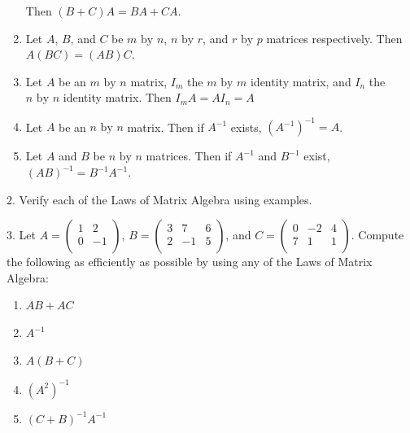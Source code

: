 \documentclass[10pt,]{book}
\theoremstyle{plain}
\theoremstyle{definition}
\theoremstyle{definition}
\theoremstyle{definition}
\theoremstyle{definition}
\begin{document}
\begin{exercisegroup}
\begin{enumerate}[label=\alph*]
 Then \((B+C)A=BA+CA\).%
\item\hypertarget{li-84}{} Let \(A\), \(B\), and \(C\) be \(m \textrm{ by } n\), \(n \textrm{ by } r\), and \(r \textrm{ by } p\) matrices respectively.
 Then \(A(BC)=(AB)C\).%
\item\hypertarget{li-85}{}Let \(A\) be an \(m \textrm{ by } n\) matrix, \(I_m\) the \(m \textrm{ by } m\) identity matrix,
 and \(I_n\) the \(n \textrm{ by } n\) identity matrix. Then \(I_mA=AI_n=A\)%
\item\hypertarget{li-86}{} Let \(A\) be an \(n \textrm{ by } n\) matrix. Then if \(A^{-1}\) exists,
 \(\left(A^{-1}\right)^{-1}=A\).%
\item\hypertarget{li-87}{} Let \(A\) and \(B\) be \(n \textrm{ by } n\) matrices.
 Then if \(A^{-1}\) and \(B^{-1}\) exist, \((AB)^{-1}=B^{-1}A^{-1}\).%
\end{enumerate}
%
\item[2.]\hypertarget{exercise-18}{} Verify each of the Laws of Matrix Algebra using examples.%
\par\smallskip
\item[3.]\hypertarget{exercise-19}{} Let \(A = \left(
\begin{array}{cc}
 1 & 2 \\
 0 & -1 \\
\end{array}
\right)\), \(B= \left(
\begin{array}{ccc}
 3 & 7 & 6 \\
 2 & -1 & 5 \\
\end{array}
\right)\), and \(C= \left(
\begin{array}{ccc}
 0 & -2 & 4 \\
 7 & 1 & 1 \\
\end{array}
\right)\). Compute the following as efficiently as possible by using any of the Laws of Matrix Algebra:%
\par
\leavevmode%
\begin{enumerate}[label=\alph*]
\item\hypertarget{li-88}{} \(A B + A C\)%
\item\hypertarget{li-89}{} \(A^{-1}\)%
\item\hypertarget{li-90}{} \(A(B + C)\)%
\item\hypertarget{li-91}{}  \(\left(A^2\right)^{-1}\)%
\item\hypertarget{li-92}{}  \((C + B)^{-1}A^{-1}\)%
\end{enumerate}

\end{exercisegroup}
\end{document}

